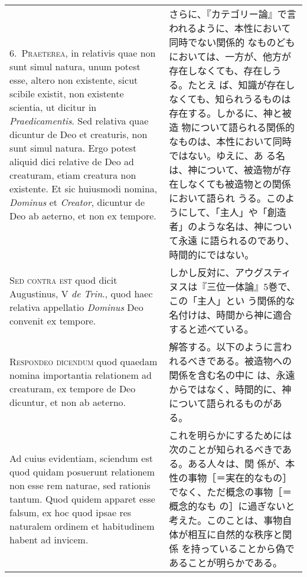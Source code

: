 \documentclass[paper=a4paper,fontsize=10pt,jafontsize=9pt,titlepage]{jlreq}
\begin{document}
\begin{longtable}{p{21em}p{21em}}
\\

6.~{\scshape Praeterea}, in relativis quae non sunt simul natura, unum
potest esse, altero non existente, sicut scibile existit, non
existente scientia, ut dicitur in {\itshape Praedicamentis}. Sed
relativa quae dicuntur de Deo et creaturis, non sunt simul
natura. Ergo potest aliquid dici relative de Deo ad creaturam, etiam
creatura non existente. Et sic huiusmodi nomina, {\itshape Dominus} et
{\itshape Creator}, dicuntur de Deo ab aeterno, et non ex tempore.

&

さらに、『カテゴリー論』で言われるように、本性において同時でない関係的
なものどもにおいては、一方が、他方が存在しなくても、存在しうる。たとえ
ば、知識が存在しなくても、知られうるものは存在する。しかるに、神と被造
物について語られる関係的なものは、本性において同時ではない。ゆえに、あ
る名は、神について、被造物が存在しなくても被造物との関係において語られ
うる。このようにして、「主人」や「創造者」のような名は、神について永遠
に語られるのであり、時間的にではない。

\\

{\scshape Sed contra est} quod dicit Augustinus, V {\itshape de
Trin}., quod haec relativa appellatio {\itshape Dominus} Deo convenit
ex tempore.

&

しかし反対に、アウグスティヌスは『三位一体論』5巻で、この「主人」とい
う関係的な名付けは、時間から神に適合すると述べている。

\\

{\scshape Respondeo dicendum} quod quaedam nomina importantia
relationem ad creaturam, ex tempore de Deo dicuntur, et non ab
aeterno.

&

解答する。以下のように言われるべきである。被造物への関係を含む名の中に
は、永遠からではなく、時間的に、神について語られるものがある。

\\

Ad cuius evidentiam, sciendum est quod quidam posuerunt relationem non
esse rem naturae, sed rationis tantum. Quod quidem apparet esse
falsum, ex hoc quod ipsae res naturalem ordinem et habitudinem habent
ad invicem.

&

これを明らかにするためには次のことが知られるべきである。ある人々は、関
係が、本性の事物［＝実在的なもの］でなく、ただ概念の事物［＝概念的なも
の］に過ぎないと考えた。このことは、事物自体が相互に自然的な秩序と関係
を持っていることから偽であることが明らかである。


\end{longtable}
\end{document}
